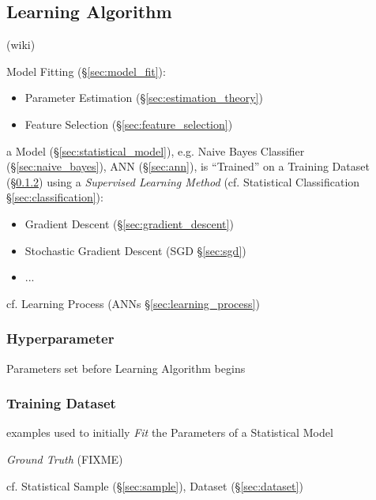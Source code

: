 \subsection{Learning Algorithm}\label{sec:learning_algorithm}

(wiki)

Model Fitting (\S\ref{sec:model_fit}):
\begin{itemize}
  \item Parameter Estimation (\S\ref{sec:estimation_theory})
  \item Feature Selection (\S\ref{sec:feature_selection})
\end{itemize}

a Model (\S\ref{sec:statistical_model}), e.g. Naive Bayes Classifier
(\S\ref{sec:naive_bayes}), ANN (\S\ref{sec:ann}), is ``Trained'' on a Training
Dataset (\S\ref{sec:training_dataset}) using a \emph{Supervised Learning Method}
(cf. Statistical Classification \S\ref{sec:classification}):
\begin{itemize}
  \item Gradient Descent (\S\ref{sec:gradient_descent})
  \item Stochastic Gradient Descent (SGD \S\ref{sec:sgd})
  \item ...
\end{itemize}

\fist cf. Learning Process (ANNs \S\ref{sec:learning_process})



\subsubsection{Hyperparameter}\label{sec:hyperparameter}

Parameters set before Learning Algorithm begins



\subsubsection{Training Dataset}\label{sec:training_dataset}

examples used to initially \emph{Fit} the Parameters of a Statistical Model

\emph{Ground Truth} (FIXME)

cf. Statistical Sample (\S\ref{sec:sample}), Dataset (\S\ref{sec:dataset})




